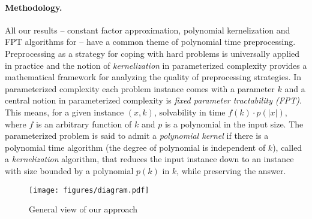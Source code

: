 \paragraph{Methodology.} 
All  our  results -- constant factor approximation, polynomial kernelization and   FPT algorithms for  \fd{} -- have a common theme of  polynomial time preprocessing. Preprocessing as a strategy for coping with hard problems is universally applied 
in practice and the notion of {\em kernelization} in parameterized complexity  provides a mathematical framework for analyzing the quality of preprocessing strategies. 
  In parameterized complexity each problem instance comes with a parameter $k$ and  a central notion in parameterized complexity is {\em fixed parameter tractability (FPT)}. This means, for a given instance $(x,k)$, solvability in time $f(k)\cdot p(|x|)$, where $f$ is an arbitrary function of $k$ and $p$ is a polynomial in the input size. 
  The parameterized problem is said to admit a {\it polynomial kernel} if there is a polynomial time algorithm (the degree of polynomial is independent of $k$), called a {\em kernelization} algorithm, that reduces the input instance down to an instance with size bounded by a polynomial $p(k)$ in $k$, while preserving the answer.  
  
  
 

\begin{figure}[t]
\begin{center}
\texttt{[image: figures/diagram.pdf]}
\caption{General  view of our approach }\label{fig:diagram}
\end{center}
\end{figure}

